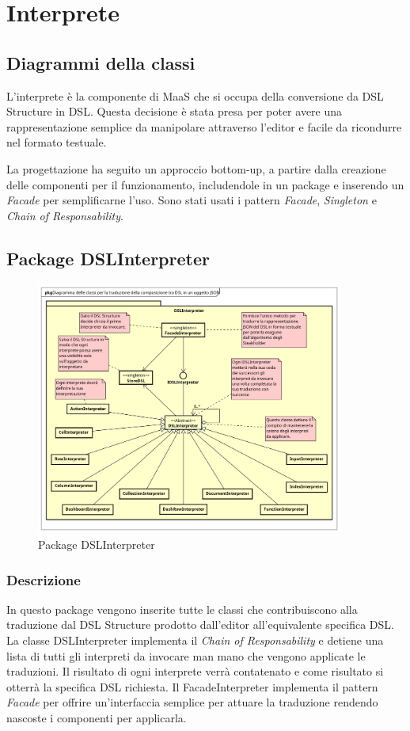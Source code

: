 \section{Interprete}
\subsection{Diagrammi della classi}
L'interprete è la componente di MaaS che si occupa della conversione da DSL Structure in DSL. Questa decisione è stata presa per poter avere una rappresentazione semplice da manipolare attraverso l'editor e facile da ricondurre nel formato testuale.

La progettazione ha seguito un approccio bottom-up, a partire dalla creazione delle componenti per il funzionamento, includendole in un package e inserendo un \textit{Facade} per semplificarne l'uso. Sono stati usati i pattern \textit{Facade}, \textit{Singleton} e \textit{Chain of Responsability}.
\subsection{Package DSLInterpreter}
\begin{figure}[H]
  \centering
  \includegraphics[width=0.9\textwidth]{res/img/Diagram_Interpreter.png}
  \caption{Package DSLInterpreter}
  \label{fig:diagram_interpreter}
\end{figure}
\subsubsection{Descrizione}
In questo package vengono inserite tutte le classi che contribuiscono alla traduzione dal DSL Structure prodotto dall'editor all'equivalente specifica DSL.
La classe DSLInterpreter implementa il \textit{Chain of Responsability} e detiene una lista di tutti gli interpreti da invocare man mano che vengono applicate le traduzioni. Il risultato di ogni interprete verrà contatenato e come risultato si otterrà la specifica DSL richiesta.
Il FacadeInterpreter implementa il pattern \textit{Facade} per offrire un'interfaccia semplice per attuare la traduzione rendendo nascoste i componenti per applicarla.
